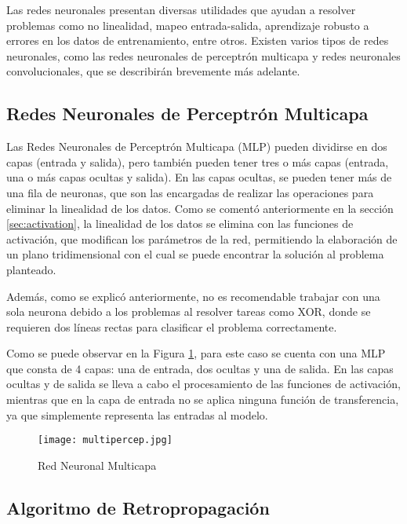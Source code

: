         Las redes neuronales presentan diversas utilidades que ayudan a resolver problemas como no linealidad, mapeo entrada-salida, aprendizaje robusto a errores en los datos de entrenamiento, entre otros. Existen varios tipos de redes neuronales, como las redes neuronales de perceptrón multicapa y redes neuronales convolucionales, que se describirán brevemente más adelante.

    \subsection{Redes Neuronales de Perceptrón Multicapa}

        Las Redes Neuronales de Perceptrón Multicapa (MLP) pueden dividirse en dos capas (entrada y salida), pero también pueden tener tres o más capas (entrada, una o más capas ocultas y salida). En las capas ocultas, se pueden tener más de una fila de neuronas, que son las encargadas de realizar las operaciones para eliminar la linealidad de los datos. Como se comentó anteriormente en la sección \ref{sec:activation}, la linealidad de los datos se elimina con las funciones de activación, que modifican los parámetros de la red, permitiendo la elaboración de un plano tridimensional con el cual se puede encontrar la solución al problema planteado.

        Además, como se explicó anteriormente, no es recomendable trabajar con una sola neurona debido a los problemas al resolver tareas como XOR, donde se requieren dos líneas rectas para clasificar el problema correctamente.

        Como se puede observar en la Figura \ref{fig:multilayer_perceptron}, para este caso se cuenta con una MLP que consta de 4 capas: una de entrada, dos ocultas y una de salida. En las capas ocultas y de salida se lleva a cabo el procesamiento de las funciones de activación, mientras que en la capa de entrada no se aplica ninguna función de transferencia, ya que simplemente representa las entradas al modelo.

        \begin{figure}[H]
            \centering
            \texttt{[image: multipercep.jpg]}
            \caption{Red Neuronal Multicapa}
            \label{fig:multilayer_perceptron}
        \end{figure}

    \subsection{Algoritmo de Retropropagación} \label{sec:backpropagation}


